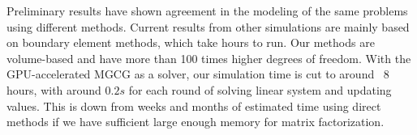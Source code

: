 Preliminary results have shown agreement in the modeling of the same problems using different methods.
Current results from other simulations are mainly based on boundary element methods, which take hours to run.
Our methods are volume-based and have more than 100 times higher degrees of freedom.
With the GPU-accelerated MGCG as a solver, our simulation time is cut to around ~8 hours, with around $0.2s$ for each round of solving linear system and updating values. 
This is down from weeks and months of estimated time using direct methods if we have sufficient large enough memory for matrix factorization.